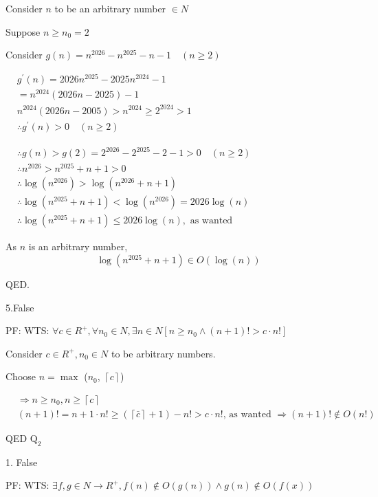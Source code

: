 \documentclass[12pt]{article}
\begin{document}
Consider $n$  to be an arbitrary number $\in N$

Suppose $n \geq n_{0}=2$

Consider $g({n}) =n^{2026}-n^{2025}-n-1 \quad(n \geq 2)$

$
\begin{aligned}
& g^{\prime}(n)=2026 n^{2025}-2025 n^{2024}-1 \\
&=n^{2024}(2026 n-2025)-1 \\
& n^{2024}(2026 n-2005)>n^{2024} \geq 2^{2024}>1 \\
& \therefore g^{\prime}(n)>0 \quad(n \geq 2)
\end{aligned}
$

$
\begin{aligned}
& \therefore g(n)>g(2)=2^{2026}-2^{2025}-2-1>0 \quad(n \geq 2) \\
& \therefore n^{2026}>n^{2025}+n+1>0 \\
& \therefore \log \left(n^{2026}\right)>\log \left(n^{2026}+n+1\right) \\
& \therefore \log \left(n^{2025}+n+1\right)<\log \left(n^{2026}\right)=2026 \log (n) \\
& \therefore \log \left(n^{2025}+n+1\right) \leq 2026 \log (n), \text { as wanted }
\end{aligned}
$

As $n$ is an arbitrary number,
\begin{equation*}
\log \left(n^{2025}+n+1\right) \in O(\log (n))
\end{equation*}

QED.

5.False


PF: WTS: $\forall c \in R^{+}, \forall n_{0} \in N, \exists n \in N\left[n \geq n_{0} \wedge(n+1)!>c \cdot n!\right]$

Consider $c\in {R }^{+}, n_{0} \in N$ to be arbitrary numbers.

Choose $n=\max$ ($n_{0}$, $\left\lceil c\right\rceil$)

$
\begin{aligned}
&\Rightarrow  n \geq n_{0}, n \geq\left\lceil c\right\rceil \\
& (n+1)!=n+1 \cdot n!\geq(\left\lceil \bar c\right\rceil+1)-n!>c\cdot n!\text {, as wanted } \Rightarrow(n+1)! \notin O(n!)
\end{aligned}
$

QED
\newpage
$\text{Q}_{2}$

1. False

PF: WTS: $\exists f, g \in N \rightarrow R^{+}, f(n) \notin O(g(n)) \wedge g(n) \notin O(f(x))$ 
\end{document}
